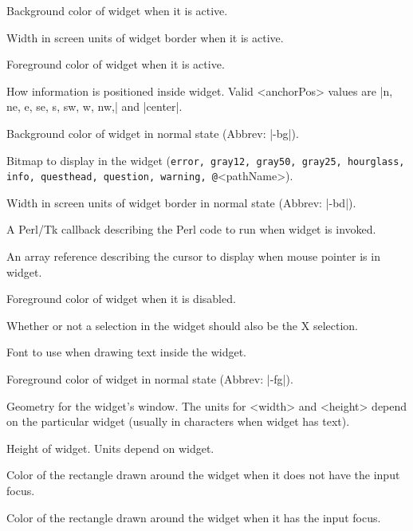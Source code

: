 \begin{enum}{1cm}

Background color of widget when it is active.

Width in screen units of widget border when it is active.

Foreground color of widget when it is active.

How information is positioned inside widget. Valid
<anchorPos> values are |n, ne, e, se, s, sw, w, nw,| and |center|.

Background color of widget in normal state (Abbrev: |-bg|).

Bitmap to display in the widget ({\tt error, gray12, gray50, gray25,
hourglass, info, questhead, question, warning, @}<pathName>).

Width in screen units of widget border in normal state (Abbrev: |-bd|).

A Perl/Tk callback describing the Perl code to run when widget is invoked.

An array reference describing the cursor to display when mouse pointer is in widget.

Foreground color of widget when it is disabled.

Whether or not a selection in the widget should also 
be the X selection.

Font to use when drawing text inside the widget.

Foreground color of widget in normal state (Abbrev: |-fg|).

Geometry for the widget's window.  The units for <width> and <height>
depend on the particular widget (usually in characters when widget has text).

Height of widget. Units depend on widget.

Color of the rectangle drawn around the widget when it does not
have the input focus.

Color of the rectangle drawn around the widget when it has the
input focus.


\end{enum}
